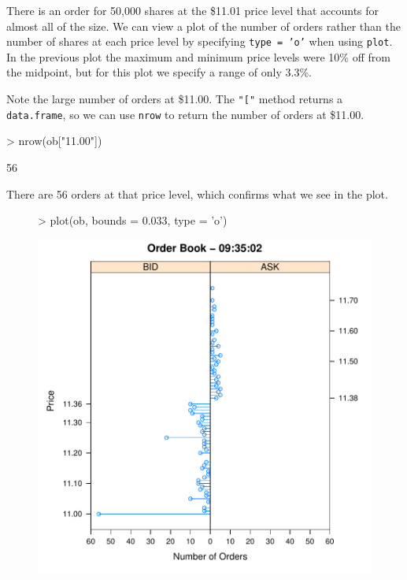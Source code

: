 There is an order for 50,000 shares at the \$11.01 price level that
accounts for almost all of the size.  We can view a plot of the number
of orders rather than the number of shares at each price level by
specifying \texttt{type = 'o'} when using \texttt{plot}. In the
previous plot the maximum and minimum price levels were 10\% off from
the midpoint, but for this plot we specify a range of only 3.3\%.

Note the large number of orders at \$11.00. The \texttt{"["} method
returns a \texttt{data.frame}, so we can use \texttt{nrow} to return
the number of orders at \$11.00.

\begin{Schunk}
\begin{Sinput}
> nrow(ob["11.00"])
\end{Sinput}
\begin{Soutput}
[1] 56
\end{Soutput}
\end{Schunk}

There are 56 orders at that price level, which confirms what
we see in the plot.

\begin{figure}
\centering
\vspace*{.1in}
\begin{Schunk}
\begin{Sinput}
> plot(ob, bounds = 0.033, type = 'o')
\end{Sinput}
\end{Schunk}
\includegraphics[scale = 0.5]{orderbook-008}
\end{figure}

